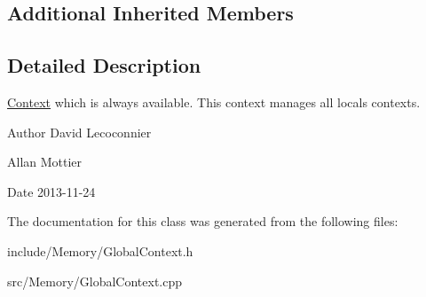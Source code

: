 \subsection*{Additional Inherited Members}


\subsection{Detailed Description}
\hyperlink{class_context}{Context} which is always available. This context manages all locals contexts. 

\begin{DoxyAuthor}{Author}
David Lecoconnier 

Allan Mottier 
\end{DoxyAuthor}
\begin{DoxyDate}{Date}
2013-\/11-\/24 
\end{DoxyDate}


The documentation for this class was generated from the following files\-:\begin{DoxyCompactItemize}
\item 
include/\-Memory/Global\-Context.\-h\item 
src/\-Memory/Global\-Context.\-cpp\end{DoxyCompactItemize}
